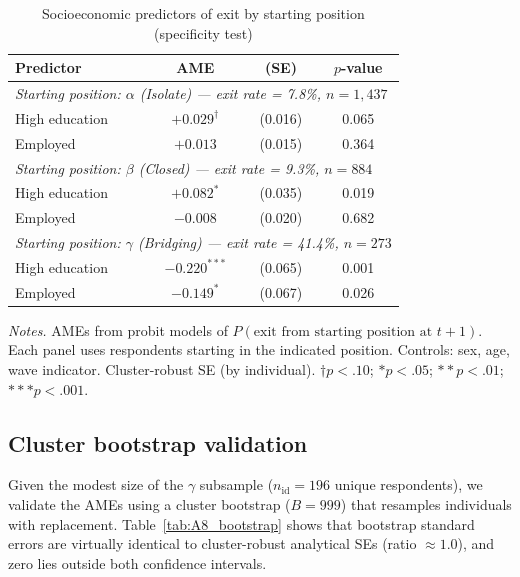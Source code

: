 \documentclass[12pt, a4paper]{article}
\newcommand{\tablenote}[1]{\vspace{4pt}\par\footnotesize\textit{Notes.} #1}
\begin{document}
\begin{table}[H]
\centering
\caption{Socioeconomic predictors of exit by starting position (specificity test)}
\label{tab:A7_specificity}
\small
\begin{tabular}{lccc}
\hline\hline
  Predictor & AME & (SE) & $p$-value \\
\hline
  \multicolumn{4}{l}{\textit{Starting position: $\alpha$ (Isolate) --- exit rate = 7.8\%, $n = 1{,}437$}} \\
\hline
  \quad High education   & $+0.029^{\dagger}$ & (0.016) & 0.065 \\
  \quad Employed         & $+0.013$           & (0.015) & 0.364 \\
\hline
  \multicolumn{4}{l}{\textit{Starting position: $\beta$ (Closed) --- exit rate = 9.3\%, $n = 884$}} \\
\hline
  \quad High education   & $+0.082^{*}$       & (0.035) & 0.019 \\
  \quad Employed         & $-0.008$           & (0.020) & 0.682 \\
\hline
  \multicolumn{4}{l}{\textit{Starting position: $\gamma$ (Bridging) --- exit rate = 41.4\%, $n = 273$}} \\
\hline
  \quad High education   & $-0.220^{***}$     & (0.065) & 0.001 \\
  \quad Employed         & $-0.149^{*}$       & (0.067) & 0.026 \\
\hline\hline
\end{tabular}
\tablenote{AMEs from probit models of $P(\text{exit from starting position at } t+1)$.
Each panel uses respondents starting in the indicated position.
Controls: sex, age, wave indicator. Cluster-robust SE (by individual).
$\dagger p<.10$; $* p<.05$; $** p<.01$; $*** p<.001$.}
\end{table}

\subsection{Cluster bootstrap validation}
\label{sec:h3_bootstrap}

Given the modest size of the $\gamma$ subsample ($n_{\text{id}} = 196$
unique respondents), we validate the AMEs using a cluster bootstrap
($B = 999$) that resamples individuals with replacement.
Table~\ref{tab:A8_bootstrap} shows that bootstrap standard errors are
virtually identical to cluster-robust analytical SEs (ratio $\approx 1.0$),
and zero lies outside both confidence intervals.
\end{document}
